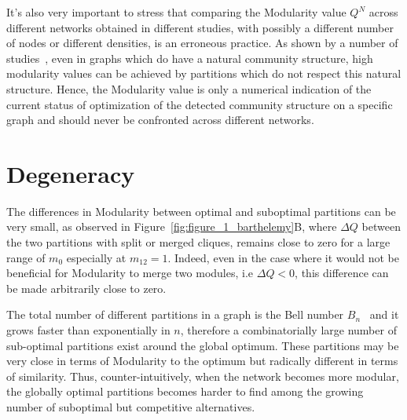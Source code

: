 It's also very important to stress that comparing the Modularity value $Q^N$ across different networks obtained in different studies, with possibly a different number of nodes or different densities, is an erroneous practice.
As shown by a number of studies~\cite{good2009,kehagias2013,radicchi2010}, even in graphs which do have a natural community structure, high modularity values can be achieved by partitions which do not respect this natural structure.
Hence, the Modularity value is only a numerical indication of the current status of optimization of the detected community structure on a specific graph and should never be confronted across different networks.

\section{Degeneracy}\label{sec:degeneracy}
The differences in Modularity between optimal and suboptimal partitions can be very small, as observed in Figure~\ref{fig:figure_1_barthelemy}B, where $\Delta Q$ between the two partitions with split or merged cliques, remains close to zero for a large range of $m_0$ especially at $m_{12}=1$.
Indeed, even in the case where it would not be beneficial for Modularity to merge two modules, i.e $\Delta Q <0$, this difference can be made arbitrarily close to zero.

The total number of different partitions in a graph is the Bell number $B_n$~\cite{stanley1997} and it grows faster than exponentially in $n$, therefore a combinatorially large number of sub-optimal partitions exist around the global optimum. These partitions may be very close in terms of Modularity to the optimum but radically different in terms of similarity.
Thus, counter-intuitively, when the network becomes more modular, the globally optimal partitions becomes harder to find among the growing number of suboptimal but competitive alternatives.

